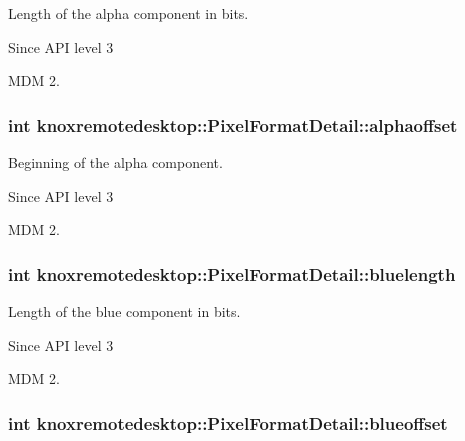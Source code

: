 \-Length of the alpha component in bits. 

\begin{DoxySince}{\-Since}
\-A\-P\-I level 3

\-M\-D\-M 2. 
\end{DoxySince}
\hypertarget{structknoxremotedesktop_1_1PixelFormatDetail_a4cfaeee3077ff3609b0d7a5aab4e5a83}{
\subsubsection[{alphaoffset}]{\setlength{\rightskip}{0pt plus 5cm}int {\bf knoxremotedesktop\-::\-Pixel\-Format\-Detail\-::alphaoffset}}}\label{structknoxremotedesktop_1_1PixelFormatDetail_a4cfaeee3077ff3609b0d7a5aab4e5a83}


\-Beginning of the alpha component. 

\begin{DoxySince}{\-Since}
\-A\-P\-I level 3

\-M\-D\-M 2. 
\end{DoxySince}
\hypertarget{structknoxremotedesktop_1_1PixelFormatDetail_aeb798caab6629e147478319285d2591f}{
\subsubsection[{bluelength}]{\setlength{\rightskip}{0pt plus 5cm}int {\bf knoxremotedesktop\-::\-Pixel\-Format\-Detail\-::bluelength}}}\label{structknoxremotedesktop_1_1PixelFormatDetail_aeb798caab6629e147478319285d2591f}


\-Length of the blue component in bits. 

\begin{DoxySince}{\-Since}
\-A\-P\-I level 3

\-M\-D\-M 2. 
\end{DoxySince}
\hypertarget{structknoxremotedesktop_1_1PixelFormatDetail_a7afad9374c4aab4d1fbe2a15396ade47}{
\subsubsection[{blueoffset}]{\setlength{\rightskip}{0pt plus 5cm}int {\bf knoxremotedesktop\-::\-Pixel\-Format\-Detail\-::blueoffset}}}\label{structknoxremotedesktop_1_1PixelFormatDetail_a7afad9374c4aab4d1fbe2a15396ade47}


